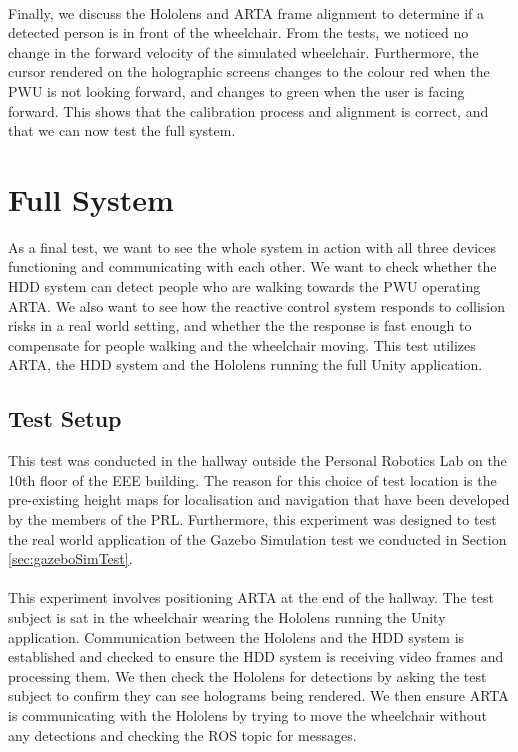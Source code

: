 \paragraph{}Finally, we discuss the Hololens and ARTA frame alignment to determine if a detected person is in front of the wheelchair. From the tests, we noticed no change in the forward velocity of the simulated wheelchair. Furthermore, the cursor rendered on the holographic screens changes to the colour red when the PWU is not looking forward, and changes to green when the user is facing forward. This shows that the calibration process and alignment is correct, and that we can now test the full system.

\newpage

\section{Full System}
As a final test, we want to see the whole system in action with all three devices functioning and communicating with each other. We want to check whether the HDD system can detect people who are walking towards the PWU operating ARTA. We also want to see how the reactive control system responds to collision risks in a real world setting, and whether the the response is fast enough to compensate for people walking and the wheelchair moving. This test utilizes ARTA, the HDD system and the Hololens running the full Unity application.

\subsection{Test Setup}
This test was conducted in the hallway outside the Personal Robotics Lab on the 10th floor of the EEE building. The reason for this choice of test location is the pre-existing height maps for localisation and navigation that have been developed by the members of the PRL. Furthermore, this experiment was designed to test the real world application of the Gazebo Simulation test we conducted in Section \ref{sec:gazeboSimTest}.

\paragraph{}This experiment involves positioning ARTA at the end of the hallway. The test subject is sat in the wheelchair wearing the Hololens running the Unity application. Communication between the Hololens and the HDD system is established and checked to ensure the HDD system is receiving video frames and processing them. We then check the Hololens for detections by asking the test subject to confirm they can see holograms being rendered. We then ensure ARTA is communicating with the Hololens by trying to move the wheelchair without any detections and checking the  ROS topic for messages.

